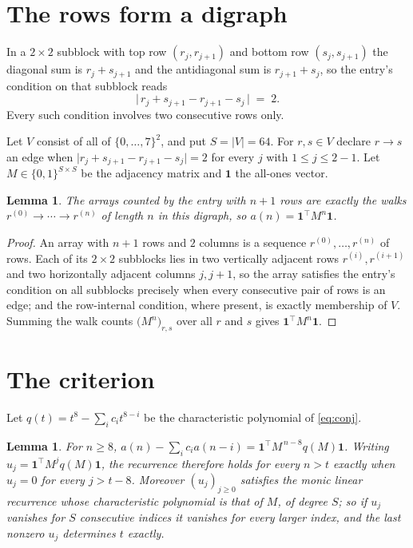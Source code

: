 \documentclass[11pt,a4paper]{article}
\theoremstyle{plain}
\newtheorem{lemma}[theorem]{Lemma}
\theoremstyle{definition}
\begin{document}
\section{The rows form a digraph}

In a $2\times2$ subblock with top row $(r_j,r_{j+1})$ and bottom row $(s_j,s_{j+1})$ the
diagonal sum is $r_j+s_{j+1}$ and the antidiagonal sum is $r_{j+1}+s_j$, so the entry's
condition on that subblock reads
\[
\bigl|\,r_j+s_{j+1}-r_{j+1}-s_j\,\bigr|\;=\;2.
\]
Every such condition involves two consecutive rows only.

Let $V$ consist of all of $\{0,\dots,7\}^{2}$, and put $S=|V|=64$. For $r,s\in V$ declare $r\to s$ an edge
when $\bigl|r_j+s_{j+1}-r_{j+1}-s_j\bigr|=2$ for every $j$ with
$1\le j\le2-1$. Let $M\in\{0,1\}^{S\times S}$ be the adjacency matrix and $\mathbf{1}$
the all-ones vector.

\begin{lemma}\label{lem:walk}
The arrays counted by the entry with $n+1$ rows are exactly the walks
$r^{(0)}\to\cdots\to r^{(n)}$ of length $n$ in this digraph, so
$a(n)=\mathbf{1}^{\!\top}M^{n}\mathbf{1}$.
\end{lemma}

\begin{proof}
An array with $n+1$ rows and $2$ columns is a sequence $r^{(0)},\dots,r^{(n)}$ of
rows. Each of its $2\times2$ subblocks lies in two vertically adjacent rows
$r^{(i)},r^{(i+1)}$ and two horizontally adjacent columns $j,j+1$, so the array satisfies
the entry's condition on all subblocks precisely when every consecutive pair of rows is an
edge; and the row-internal condition, where present, is exactly membership of $V$. Summing
the walk counts $\bigl(M^{n}\bigr)_{r,s}$ over all $r$ and $s$ gives
$\mathbf{1}^{\!\top}M^{n}\mathbf{1}$.
\end{proof}

\section{The criterion}

Let $q(t)=t^{8}-\sum_i c_i t^{8-i}$ be the characteristic polynomial of
\eqref{eq:conj}.

\begin{lemma}\label{lem:crit}
For $n\ge8$,
$a(n)-\sum_i c_i a(n-i)=\mathbf{1}^{\!\top}M^{\,n-8}q(M)\mathbf{1}$. Writing
$u_j=\mathbf{1}^{\!\top}M^{j}q(M)\mathbf{1}$, the recurrence therefore holds for every
$n>t$ exactly when $u_j=0$ for every $j>t-8$. Moreover $(u_j)_{j\ge0}$ satisfies the
monic linear recurrence whose characteristic polynomial is that of $M$, of degree $S$; so
if $u_j$ vanishes for $S$ consecutive indices it vanishes for every larger index, and the
last nonzero $u_j$ determines $t$ exactly.
\end{lemma}
\end{document}
